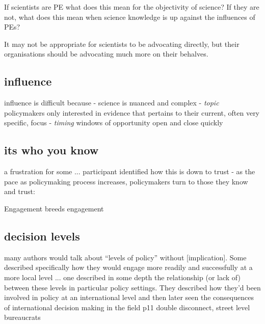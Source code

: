 If scientists are PE what does this mean for the objectivity of science?
If they are not, what does this mean when science knowledge is up against the influences of PEs?


It may not be appropriate for scientists to be advocating directly, but their organisations should be advocating much more on their behalves.


\subsection{influence}
influence is difficult because
- \emph{} science is nuanced and complex
- \emph{topic} policymakers only interested in evidence that pertains to their current, often very specific, focus
- \emph{timing} windows of opportunity open and close quickly

\subsection{its who you know}
a frustration for some ...
participant identified how this is down to trust - as the pace as policymaking process increases, policymakers turn to those they know and trust: 

Engagement breeds engagement

\subsection{decision levels}
many authors would talk about ``levels of policy'' without [implication]. Some described specifically how they would engage more readily and successfully at a more local level ... one described in some depth the relationship (or lack of) between these levels in particular policy settings. They described how they'd been involved in policy at an international level and then later seen the consequences of international decision making in the field p11 double disconnect, street level bureaucrats

